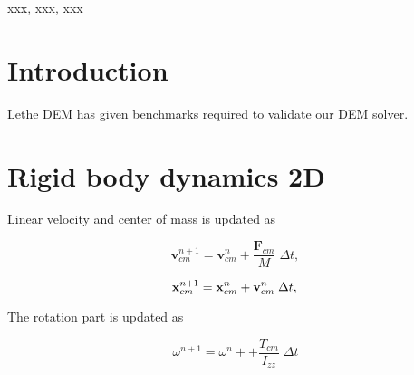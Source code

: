 \documentclass[preprint,12pt]{elsarticle}
\newcommand{\ten}[1]{\ensuremath{\mathbf{#1}}}
\begin{document}
\begin{frontmatter}

  \title{}
  \author[XXX]{Dinesh Adepu}
  \author[XXX]{Pawan Negi }
  \author[University of Surrey]{Chuan Yu Wu}
\address[xxx]{xxx}



\begin{abstract}
\end{abstract}

\begin{keyword}
{xxx}, {xxx}, {xxx}


\end{keyword}

\end{frontmatter}



\FloatBarrier%
\section{Introduction}
\label{sec:conclusions}
Lethe DEM has given benchmarks required to validate our DEM solver.



\FloatBarrier%
\section{Rigid body dynamics 2D}
\label{sec:rb_2d}

Linear velocity and center of mass is updated as


\begin{equation}
  \label{eq:rfc:lin_vel_cm_update}
  \ten{v}_{cm}^{n+1} = \ten{v}_{cm}^{n} + \frac{\ten{F}_{cm}}{M} \; \Delta t,
\end{equation}

\begin{equation}
  \label{eq:rfc:lin_pos_cm_update}
  \ten{x}_{cm}^{n+1} = \ten{x}_{cm}^{n} + \ten{v}_{cm}^{n} \; \Delta t,\\
\end{equation}


The rotation part is updated as


\begin{equation}
  \label{eq:rfc:lin_vel_cm_update}
  \omega^{n+1} = \omega^{n} +  + \frac{T_{cm}}{I_{zz}} \; \Delta t
\end{equation}
\end{document}
